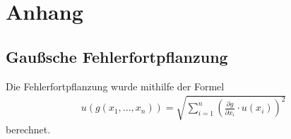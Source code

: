 \documentclass[11pt, a4paper]{article}
\begin{document}
    \section{Anhang}
    \subsection{Gaußsche Fehlerfortpflanzung}
    Die Fehlerfortpflanzung wurde mithilfe der Formel
    \begin{align}
        u\left(g \left(x_1, ..., x_n\right)\right) = \sqrt{\sum_{i=1}^n \left( \frac{\partial g }{\partial x_i} \cdot u\left(x_i\right) \right)^2} \label{gauss}
    \end{align}
    berechnet.
    
    
\end{document}

